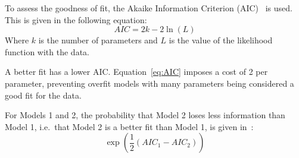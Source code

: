 To assess the goodness of fit,
    the Akaike Information Criterion (AIC)~\cite{AIC_1974} is used.
This is given in the following equation:
\begin{equation}\label{eq:AIC}
    AIC = 2k - 2\ln \left( L \right)
\end{equation}
Where $k$ is the number of parameters and $L$ is the value of the likelihood function with the data.

A better fit has a lower AIC.
Equation~\ref{eq:AIC} imposes a cost of 2 per parameter,
    preventing overfit models with many parameters being considered a good fit for the data.

For Models 1 and 2, the probability that Model 2 loses less information than Model 1,
    i.e.\ that Model 2 is a better fit than Model 1,
    is given in~\cite{AIC_Info}:
\begin{equation}\label{eq:AIC_Info}
    \exp \left( \frac{1}{2} \left( AIC_1 - AIC_2 \right) \right)
\end{equation}
